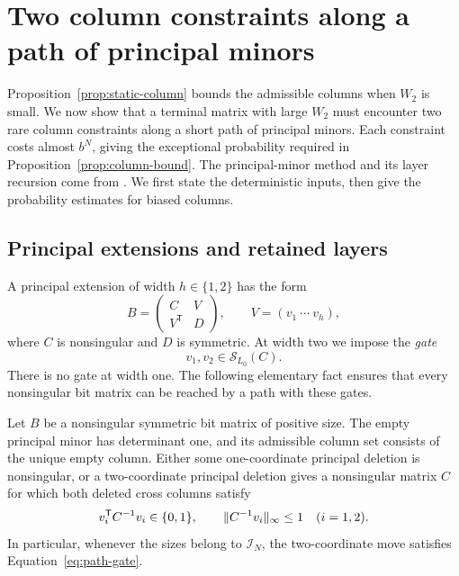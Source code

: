 \section{Two column constraints along a path of principal minors}\label{sec:paths}

Proposition~\ref{prop:static-column} bounds the admissible columns when
\(W_2\) is small. We now show that a terminal matrix with large \(W_2\)
must encounter two rare column constraints along a short path of principal
minors. Each constraint costs almost \(b^N\), giving the exceptional
probability required in Proposition~\ref{prop:column-bound}.
The principal-minor method and its layer recursion come from
\cite[Sections 7 and 11]{SymmetricRate}. We first state the deterministic
inputs, then give the probability estimates for biased columns.

\subsection{Principal extensions and retained layers}

A principal extension of width \(h\in\{1,2\}\) has the form
\begin{equation}\label{eq:path-extension}
 B=\begin{pmatrix}C&V\\V^{\mathsf T}&D\end{pmatrix},
 \qquad V=(v_1\ \cdots\ v_h),
\end{equation}
where \(C\) is nonsingular and \(D\) is symmetric. At width two we impose
the \emph{gate}
\begin{equation}\label{eq:path-gate}
 v_1,v_2\in\mathcal S_{L_0}(C).
\end{equation}
There is no gate at width one. The following elementary fact ensures that
every nonsingular bit matrix can be reached by a path with these gates.

\begin{lemma}
\label{lem:path-deletion}
Let \(B\) be a nonsingular symmetric bit matrix of positive size.
The empty principal minor has determinant one, and its admissible
column set consists of the unique empty column.
Either some one-coordinate principal deletion is nonsingular, or a
two-coordinate principal deletion gives a nonsingular matrix \(C\) for
which both deleted cross columns satisfy
\[
 v_i^{\mathsf T}C^{-1}v_i\in\{0,1\},
 \qquad \lVert C^{-1}v_i\rVert_\infty\le1
 \quad(i=1,2).
\]
In particular, whenever the sizes belong to \(\mathcal I_N\), the
two-coordinate move satisfies Equation~\eqref{eq:path-gate}.
\end{lemma}

